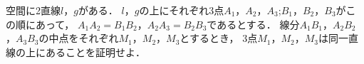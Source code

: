 \documentclass[../../main.tex]{subfiles}
\begin{document}
空間に2直線$l$，$g$がある．
$l$，$g$の上にそれぞれ3点$A_1$，$A_2$，$A_3$;$B_1$，$B_2$，$B_3$がこの順にあって，
$A_1A_2=B_1B_2$，$A_2A_3=B_2B_3$であるとする．
線分$A_1B_1$，$A_2B_2$，$A_3B_3$の中点をそれぞれ$M_1$，$M_2$，$M_3$とするとき，
3点$M_1$，$M_2$，$M_3$は同一直線の上にあることを証明せよ．
\end{document}
